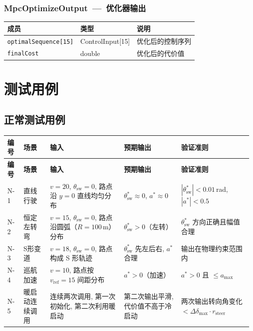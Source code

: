 \documentclass[a4paper,10pt]{article}
\begin{document}
\subsubsection{MpcOptimizeOutput~---~优化器输出}
\begin{longtable}{|L{4.5cm}|C{2.8cm}|L{7.7cm}|}
\hline
\textbf{成员} & \textbf{类型} & \textbf{说明} \\
\hline
\texttt{optimalSequence[15]} & ControlInput[15] & 优化后的控制序列 \\
\hline
\texttt{finalCost} & double & 优化后的代价值 \\
\hline
\end{longtable}

\section{测试用例}

\subsection{正常测试用例}

{\small
\begin{longtable}{|C{0.6cm}|L{2.2cm}|L{4.8cm}|L{4.0cm}|L{3.5cm}|}
\hline
\textbf{编号} & \textbf{场景} & \textbf{输入} & \textbf{预期输出} & \textbf{验证准则} \\
\hline
\endfirsthead
\hline
\textbf{编号} & \textbf{场景} & \textbf{输入} & \textbf{预期输出} & \textbf{验证准则} \\
\hline
\endhead
N-1 &
直线行驶 &
$v{=}20$, $\theta_{\text{sw}}{=}0$, 路点沿 $y{=}0$ 直线均匀分布 &
$\theta_{\text{sw}}^* \approx 0$, $a^* \approx 0$ &
$|\theta_{\text{sw}}^*| < 0.01$\,rad, $|a^*| < 0.5$ \\
\hline
N-2 &
恒定左转弯 &
$v{=}15$, $\theta_{\text{sw}}{=}0$, 路点沿圆弧（$R{=}100$\,m）分布 &
$\theta_{\text{sw}}^* > 0$（左转） &
$\theta_{\text{sw}}^*$ 方向正确且幅值合理 \\
\hline
N-3 &
S形变道 &
$v{=}18$, $\theta_{\text{sw}}{=}0$, 路点构成 S 形轨迹 &
$\theta_{\text{sw}}^*$ 先左后右, $a^*$ 合理 &
输出在物理约束范围内 \\
\hline
N-4 &
巡航加速 &
$v{=}10$, 路点按 $v_{\text{ref}}{=}15$ 间距分布 &
$a^* > 0$（加速） &
$a^* > 0$ 且 $\leq a_{\max}$ \\
\hline
N-5 &
暖启动连续调用 &
连续两次调用, 第一次初始化, 第二次利用暖启动 &
第二次输出平滑, 代价值不高于冷启动 &
两次输出转向角变化 $< \Delta\delta_{\max} \cdot r_{\text{steer}}$ \\
\hline
\end{longtable}
}
\end{document}
